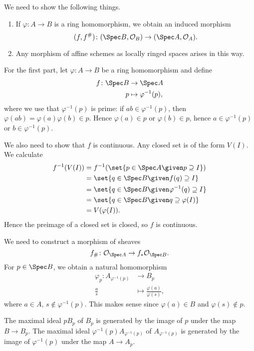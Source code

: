 We need to show the following things.
\begin{enumerate}
	\item If $\varphi\colon A\to B$ is a ring homomorphism, we obtain an
		induced morphism
		\[ (f, f^\#)\colon (\Spec B, \mathcal{O}_B)\to (\Spec A, \mathcal{O}_A). \]
	\item Any morphism of affine schemes as locally ringed spaces arises in
		this way.
\end{enumerate}

For the first part, let $\varphi\colon A\to B$ be a ring homomorphism and define
\begin{align*}
	f\colon \Spec B&\to \Spec A\\
	p&\mapsto \varphi^{-1}(p),
\end{align*}
where we use that $\varphi^{-1}(p)$ is prime: if $ab \in \varphi^{-1}(p)$, then
$\varphi(ab) = \varphi(a)\varphi(b) \in p$. Hence $\varphi(a) \in p$ or
$\varphi(b) \in p$, hence $a \in \varphi^{-1}(p)$ or $b \in \varphi^{-1}(p)$.

We also need to show that $f$ is continuous. Any closed set is of the form
$V(I)$. We calculate
\begin{align*}
	f^{-1}(V(I)) &= f^{-1}(\set{p \in \Spec A\given p\supseteq I})\\
	&= \set{q \in \Spec B\given f(q) \supseteq I}\\
	&= \set{q \in \Spec B\given \varphi^{-1}(q)\supseteq I}\\
	&= \set{q \in \Spec B\given q\supseteq \varphi(I)}\\
	&= V(\varphi(I)).
\end{align*}
Hence the preimage of a closed set is closed, so $f$ is continuous.

We need to construct a morphism of sheaves
\[ f_\#\colon \mathcal{O}_{\Spec A} \to f_*\mathcal{O}_{\Spec B}. \]
For $p \in \Spec B$, we obtain a natural homomorphism
\begin{align*}
	\varphi_p\colon A_{\varphi^{-1}(p)}&\to B_p\\
	\frac{a}{s}&\mapsto \frac{\varphi(a)}{\varphi(s)},
\end{align*}
where $a \in A$, $s\notin \varphi^{-1}(p)$. This makes sense since $\varphi(a) \in B$
and $\varphi(s)\notin p$.

The maximal ideal $pB_p$ of $B_p$ is generated by the image of $p$ under the map
$B\to B_p$. The maximal ideal $\varphi^{-1}(p)A_{\varphi^{-1}(p)}$ of $A_{\varphi^{-1}(p)}$ is generated by the image
of $\varphi^{-1}(p)$ under the map $A\to A_p$.

